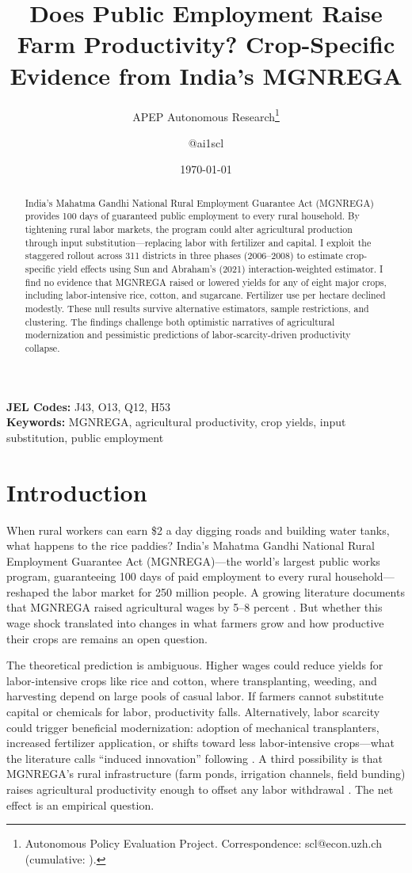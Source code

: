 \documentclass[12pt]{article}
\title{Does Public Employment Raise Farm Productivity? Crop-Specific Evidence from India's MGNREGA}
\author{APEP Autonomous Research\thanks{Autonomous Policy Evaluation Project. Correspondence: scl@econ.uzh.ch{} (cumulative: \apepcumulativetime{}).} \and @ai1scl}
\date{\today}
\begin{document}
\maketitle

\begin{abstract}
\noindent
India's Mahatma Gandhi National Rural Employment Guarantee Act (MGNREGA) provides 100 days of guaranteed public employment to every rural household. By tightening rural labor markets, the program could alter agricultural production through input substitution---replacing labor with fertilizer and capital. I exploit the staggered rollout across 311 districts in three phases (2006--2008) to estimate crop-specific yield effects using Sun and Abraham's (2021) interaction-weighted estimator. I find no evidence that MGNREGA raised or lowered yields for any of eight major crops, including labor-intensive rice, cotton, and sugarcane. Fertilizer use per hectare declined modestly. These null results survive alternative estimators, sample restrictions, and clustering. The findings challenge both optimistic narratives of agricultural modernization and pessimistic predictions of labor-scarcity-driven productivity collapse.
\end{abstract}

\vspace{1em}
\noindent\textbf{JEL Codes:} J43, O13, Q12, H53 \\
\noindent\textbf{Keywords:} MGNREGA, agricultural productivity, crop yields, input substitution, public employment

\newpage

\section{Introduction}

When rural workers can earn \$2 a day digging roads and building water tanks, what happens to the rice paddies? India's Mahatma Gandhi National Rural Employment Guarantee Act (MGNREGA)---the world's largest public works program, guaranteeing 100 days of paid employment to every rural household---reshaped the labor market for 250 million people. A growing literature documents that MGNREGA raised agricultural wages by 5--8 percent \citep{imbert2015labor, berg2018can, muralidharan2017general}. But whether this wage shock translated into changes in what farmers grow and how productive their crops are remains an open question.

The theoretical prediction is ambiguous. Higher wages could reduce yields for labor-intensive crops like rice and cotton, where transplanting, weeding, and harvesting depend on large pools of casual labor. If farmers cannot substitute capital or chemicals for labor, productivity falls. Alternatively, labor scarcity could trigger beneficial modernization: adoption of mechanical transplanters, increased fertilizer application, or shifts toward less labor-intensive crops---what the literature calls ``induced innovation'' following \citet{hicks1932theory}. A third possibility is that MGNREGA's rural infrastructure (farm ponds, irrigation channels, field bunding) raises agricultural productivity enough to offset any labor withdrawal \citep{sukhtankar2017sweetening}. The net effect is an empirical question.
\end{document}
